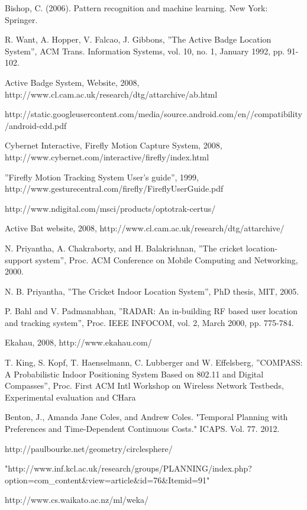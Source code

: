 \documentclass[12pt]{informatics-report}
\begin{document}
\begin{thebibliography}{99}
 Bishop, C. (2006). Pattern recognition and machine learning. New York: Springer.

 R. Want, A. Hopper, V. Falcao, J. Gibbons, ”The Active Badge Location System”, ACM Trans. Information Systems, vol. 10, no. 1, January 1992, pp. 91-102.

 Active Badge System, Website, 2008, http://www.cl.cam.ac.uk/research/dtg/attarchive/ab.html

 http://static.googleusercontent.com/media/source.android.com/en//compatibility/android-cdd.pdf

 Cybernet Interactive, Firefly Motion Capture System, 2008, http://www.cybernet.com/interactive/firefly/index.html 

 ”Firefly Motion Tracking System User’s guide”, 1999, http://www.gesturecentral.com/firefly/FireflyUserGuide.pdf

 http://www.ndigital.com/msci/products/optotrak-certus/

 Active Bat website, 2008, http://www.cl.cam.ac.uk/research/dtg/attarchive/

 N. Priyantha, A. Chakraborty, and H. Balakrishnan, ”The cricket location- support system”, Proc. ACM Conference on Mobile Computing and Networking, 2000. 

 N. B. Priyantha, ”The Cricket Indoor Location System”, PhD thesis, MIT, 2005.

 P. Bahl and V. Padmanabhan, ”RADAR: An in-building RF based user location and tracking system”, Proc. IEEE INFOCOM, vol. 2, March 2000, pp. 775-784.

 Ekahau, 2008, http://www.ekahau.com/

 T. King, S. Kopf, T. Haenselmann, C. Lubberger and W. Effelsberg, ”COMPASS: A Probabilistic Indoor Positioning System Based on 802.11 and Digital Compasses”, Proc. First ACM Intl Workshop on Wireless Network Testbeds, Experimental evaluation and CHara

 Benton, J., Amanda Jane Coles, and Andrew Coles. "Temporal Planning with Preferences and Time-Dependent Continuous Costs." ICAPS. Vol. 77. 2012.

 http://paulbourke.net/geometry/circlesphere/


 "http://www.inf.kcl.ac.uk/research/groups/PLANNING/index.php?option=com\_content\&view=article\&id=76\&Itemid=91"

 http://www.cs.waikato.ac.nz/ml/weka/
\end{thebibliography}
\appendix



\end{document}
